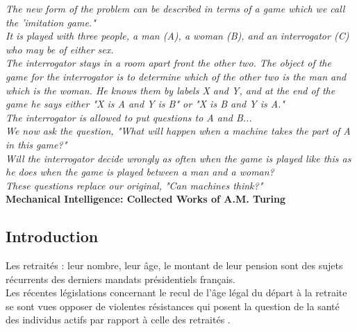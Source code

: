 \documentclass{book}
\begin{document}
\bigskip
\begin{flushright}
\textit{The new form of the problem can be described in terms of a game which we call the 'imitation game."\\
It is played with three people, a man (A), a woman (B), and an interrogator (C) who may be of either sex.\\
The interrogator stays in a room apart front the other two. The object of the game for the interrogator is to determine which of the other two is the man and which is the woman. He knows them by labels X and Y, and at the end of the game he says either "X is A and Y is B" or "X is B and Y is A."\\
The interrogator is allowed to put questions to A and B...\\
We now ask the question, "What will happen when a machine takes the part of A in this game?"\\
Will the interrogator decide wrongly as often when the game is played like this as he does when the game is played between a man and a woman?\\
These questions replace our original, "Can machines think?"}\\
\textbf{Mechanical Intelligence: Collected Works of A.M. Turing}
\end{flushright}


\mainmatter


\newpage
\begin{center}
\section*{Introduction}
\end{center}

\noindent
Les retraités : leur nombre, leur âge, le montant de leur pension sont des sujets récurrents des derniers mandats présidentiels français.\\
Les récentes législations\cite{noauthor_code_nodate} concernant le recul de l'âge légal du départ à la retraite se sont vues opposer de violentes résistances qui posent la question de la santé des individus actifs par rapport à celle des retraités\cite{fatas_experimental_2007} .\\
\end{document}
